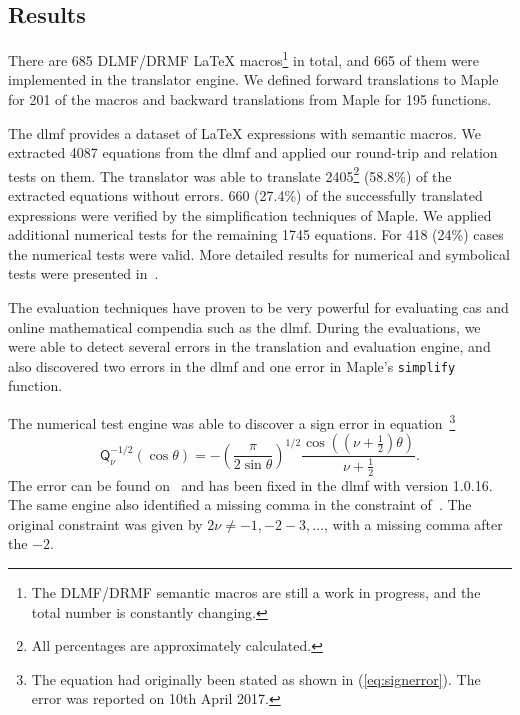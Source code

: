 \documentclass[a4paper,11pt]{article}
\newcommand{\DLMF}{DLMF}
\newcommand{\DRMF}{DRMF}
\newcommand{\Maple}{Maple}
\newcommand{\Macro}{\DLMF/\DRMF{} \LaTeX{} macro}
\theoremstyle{defTheoStyle}
\theoremstyle{defExampStyle}
\begin{document}
\subsection{Results}\label{sec:test-summary}
There are 685 \Macro{}s\footnote{The DLMF/DRMF semantic macros are still a work in progress, and the total number is constantly changing.} in total, and 665 of them were implemented in the translator engine. We defined forward translations to \Maple{} for 201 of the macros and backward translations from \Maple{} for 195 functions. 

The \gls*{dlmf} provides a dataset of \LaTeX{} expressions with semantic macros. We extracted 4087 equations from the \gls*{dlmf} and applied our round-trip and relation tests on them. The translator was able to translate 2405\footnote{All percentages are approximately calculated.} (58.8\%) of the extracted equations without errors. 660 (27.4\%) of the successfully translated expressions were verified by the simplification techniques of \Maple. We applied additional numerical tests for the remaining 1745 equations. For 418 (24\%) cases the numerical tests were valid. More detailed results for numerical and symbolical tests were presented in~\parencite{NumericalTests:Paper}.


The evaluation techniques have proven to be very powerful for evaluating \gls*{cas} and online mathematical compendia such as the \gls*{dlmf}. During the evaluations, we were able to detect several errors in the translation and evaluation engine, and also discovered two errors in the \gls*{dlmf} and one error in \Maple's \texttt{simplify} function.

The numerical test engine was able to discover a sign error in equation~\parencite[(14.5.14)]{NIST:DLMF}\footnote{The equation had originally been stated as shown in (\ref{eq:signerror}). The error was reported on 10th April 2017.}
\begin{equation}\label{eq:signerror}
\displaystyle \mathsf{Q}^{-1/2}_{\nu}\left(\cos\theta\right)=-\left(\frac{\pi}{2\sin\theta}\right)^{1/2}\frac{\cos\left(\left(\nu+\frac{1}{2}\right)\theta\right)}{\nu+\frac{1}{2}}.
\end{equation}
The error can be found on~\parencite[p. 359]{NIST:Handbook} and has been fixed in the \gls*{dlmf} with version 1.0.16. The same engine also identified a missing comma in the constraint of~\parencite[(10.16.7)]{NIST:DLMF}. The original constraint was given by $2\nu \neq -1, -2 -3, \ldots$, with a missing comma after the $-2$.
\end{document}
